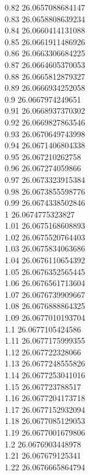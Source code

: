{0.82	26.0657088684147\\
0.83	26.0658808639234\\
0.84	26.0660414131088\\
0.85	26.0661911486926\\
0.86	26.0663306684225\\
0.87	26.0664605370053\\
0.88	26.0665812879327\\
0.89	26.0666934252058\\
0.9	26.0667974249651\\
0.91	26.0668937370302\\
0.92	26.0669827863546\\
0.93	26.0670649743998\\
0.94	26.0671406804338\\
0.95	26.067210262758\\
0.96	26.067274059866\\
0.97	26.0673323915384\\
0.98	26.0673855598776\\
0.99	26.0674338502846\\
1	26.0674775323827\\
1.01	26.0675168608893\\
1.02	26.0675520764403\\
1.03	26.0675834063686\\
1.04	26.0676110654392\\
1.05	26.0676352565445\\
1.06	26.0676561713604\\
1.07	26.0676739909667\\
1.08	26.0676888864325\\
1.09	26.0677010193704\\
1.1	26.0677105424586\\
1.11	26.0677175999355\\
1.12	26.067722328066\\
1.13	26.0677248555826\\
1.14	26.0677253041016\\
1.15	26.067723788517\\
1.16	26.0677204173718\\
1.17	26.0677152932094\\
1.18	26.0677085129053\\
1.19	26.0677001679806\\
1.2	26.0676903448978\\
1.21	26.067679125341\\
1.22	26.0676665864794\\
}
